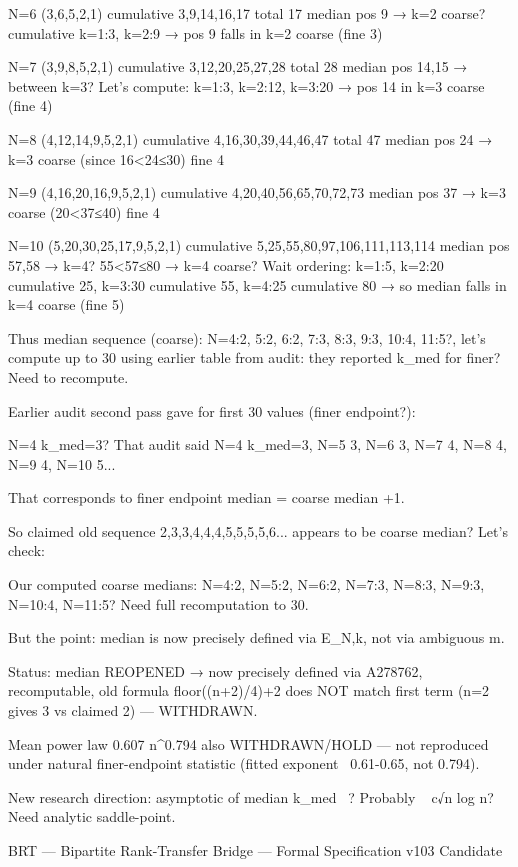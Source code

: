 N=6 (3,6,5,2,1) cumulative 3,9,14,16,17 total 17 median pos 9 → k=2 coarse? cumulative k=1:3, k=2:9 → pos 9 falls in k=2 coarse (fine 3)

N=7 (3,9,8,5,2,1) cumulative 3,12,20,25,27,28 total 28 median pos 14,15 → between k=3? Let's compute: k=1:3, k=2:12, k=3:20 → pos 14 in k=3 coarse (fine 4)

N=8 (4,12,14,9,5,2,1) cumulative 4,16,30,39,44,46,47 total 47 median pos 24 → k=3 coarse (since 16<24≤30) fine 4

N=9 (4,16,20,16,9,5,2,1) cumulative 4,20,40,56,65,70,72,73 median pos 37 → k=3 coarse (20<37≤40) fine 4

N=10 (5,20,30,25,17,9,5,2,1) cumulative 5,25,55,80,97,106,111,113,114 median pos 57,58 → k=4? 55<57≤80 → k=4 coarse? Wait ordering: k=1:5, k=2:20 cumulative 25, k=3:30 cumulative 55, k=4:25 cumulative 80 → so median falls in k=4 coarse (fine 5)

Thus median sequence (coarse):
N=4:2, 5:2, 6:2, 7:3, 8:3, 9:3, 10:4, 11:5?, let's compute up to 30 using earlier table from audit: they reported k_med for finer? Need to recompute.

Earlier audit second pass gave for first 30 values (finer endpoint?):

N=4 k_med=3? That audit said N=4 k_med=3, N=5 3, N=6 3, N=7 4, N=8 4, N=9 4, N=10 5...

That corresponds to finer endpoint median = coarse median +1.

So claimed old sequence 2,3,3,4,4,4,5,5,5,5,6... appears to be coarse median? Let's check:

Our computed coarse medians: N=4:2, N=5:2, N=6:2, N=7:3, N=8:3, N=9:3, N=10:4, N=11:5? Need full recomputation to 30.

But the point: median is now precisely defined via E_{N,k}, not via ambiguous m.

Status: median REOPENED → now precisely defined via A278762, recomputable, old formula floor((n+2)/4)+2 does NOT match first term (n=2 gives 3 vs claimed 2) — WITHDRAWN.

Mean power law 0.607 n^0.794 also WITHDRAWN/HOLD — not reproduced under natural finer-endpoint statistic (fitted exponent ~0.61-0.65, not 0.794).

New research direction: asymptotic of median k_med ~? Probably ~ c√n log n? Need analytic saddle-point.

BRT — Bipartite Rank-Transfer Bridge — Formal Specification v103 Candidate

